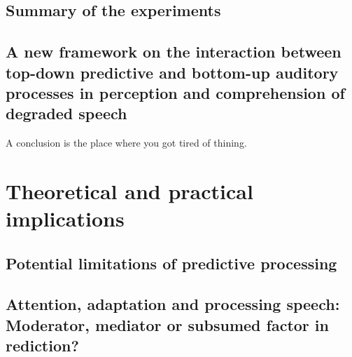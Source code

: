 \documentclass[a4paper, nobind]{templates/ociamthesis}
\begin{document}
\hypertarget{summary-of-the-experiments}{%
\section{Summary of the experiments}\label{summary-of-the-experiments}}

\hypertarget{a-new-framework-on-the-interaction-between-top-down-predictive-and-bottom-up-auditory-processes-in-perception-and-comprehension-of-degraded-speech}{%
\section{A new framework on the interaction between top-down predictive and bottom-up auditory processes in perception and comprehension of degraded speech}\label{a-new-framework-on-the-interaction-between-top-down-predictive-and-bottom-up-auditory-processes-in-perception-and-comprehension-of-degraded-speech}}

\minitoc 

\begin{savequote}
A conclusion is the place where you got tired of thining.
\end{savequote}



\hypertarget{theoretical-and-practical-implications}{%
\chapter{Theoretical and practical implications}\label{theoretical-and-practical-implications}}

\hypertarget{potential-limitations-of-predictive-processing}{%
\section{Potential limitations of predictive processing}\label{potential-limitations-of-predictive-processing}}

\hypertarget{attention-adaptation-and-processing-speech-moderator-mediator-or-subsumed-factor-in-rediction}{%
\section{Attention, adaptation and processing speech: Moderator, mediator or subsumed factor in rediction?}\label{attention-adaptation-and-processing-speech-moderator-mediator-or-subsumed-factor-in-rediction}}
\end{document}
